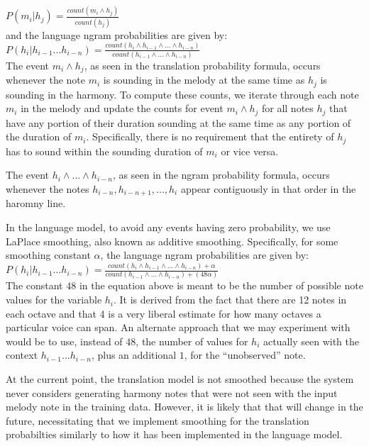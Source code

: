 \documentclass{sig-alternate}
\begin{document}
$P(m_{i} | h_{j}) = \frac{count(m_{i} \wedge h_{j})}{count(h_{j})}$\\

and the language ngram probabilities are given by: \\

$P(h_{i} | h_{i - 1} ... h_{i - n}) = \frac{count(h_{i} \wedge h_{i - 1} \wedge ... \wedge h_{i - n})}{count(h_{i - 1} \wedge ... \wedge h_{i - n})}$\\

The event $m_{i} \wedge h_{j}$, as seen in the translation probability formula, occurs whenever the note $m_{i}$ is sounding in the melody at the same time as $h_{j}$ is sounding in the harmony. To compute these counts, we iterate through each note $m_{i}$ in the melody and update the counts for event $m_{i} \wedge h_{j}$ for all notes $h_{j}$ that have any portion of their duration sounding at the same time as any portion of the duration of $m_{i}$. Specifically, there is no requirement that the entirety of $h_{j}$ has to sound within the sounding duration of $m_{i}$ or vice versa. 

The event $h_{i} \wedge ... \wedge h_{i - n}$, as seen in the ngram probability formula, occurs whenever the notes $h_{i - n}, h_{i - n + 1}, ..., h_{i}$ appear contiguously in that order in the haromny line. 

In the language model, to avoid any events having zero probability, we use LaPlace smoothing, also known as additive smoothing. Specifically, for some smoothing constant $\alpha$, the language ngram probabilities are given by: \\

$P(h_{i} | h_{i - 1} ... h_{i - n}) = \frac{count(h_{i} \wedge h_{i - 1} \wedge ... \wedge h_{i - n}) + \alpha}{count(h_{i - 1} \wedge ... \wedge h_{i - n}) + (48\alpha)}$\\

The constant $48$ in the equation above is meant to be the number of possible note values for the variable $h_{i}$. It is derived from the fact that there are 12 notes in each octave and that 4 is a very liberal estimate for how many octaves a particular voice can span. An alternate approach that we may experiment with would be to use, instead of $48$, the number of values for $h_{i}$ actually seen with the context $h_{i -1} ... h_{i - n}$, plus an additional $1$, for the ``unobserved'' note.

At the current point, the translation model is not smoothed because the system never considers generating harmony notes that were not seen with the input melody note in the training data. However, it is likely that that will change in the future, necessitating that we implement smoothing for the translation probabilties similarly to how it has been implemented in the language model. 
\end{document}
